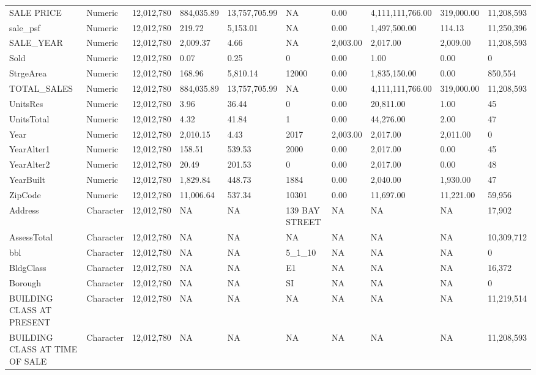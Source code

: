\documentclass[12pt,]{article}
\begin{document}
\begin{table}
{\begin{tabular}[t]{llllllllll}
SALE PRICE & Numeric & 12,012,780 & 884,035.89 & 13,757,705.99 & NA & 0.00 & 4,111,111,766.00 & 319,000.00 & 11,208,593\\
sale\_psf & Numeric & 12,012,780 & 219.72 & 5,153.01 & NA & 0.00 & 1,497,500.00 & 114.13 & 11,250,396\\
SALE\_YEAR & Numeric & 12,012,780 & 2,009.37 & 4.66 & NA & 2,003.00 & 2,017.00 & 2,009.00 & 11,208,593\\
Sold & Numeric & 12,012,780 & 0.07 & 0.25 & 0 & 0.00 & 1.00 & 0.00 & 0\\
StrgeArea & Numeric & 12,012,780 & 168.96 & 5,810.14 & 12000 & 0.00 & 1,835,150.00 & 0.00 & 850,554\\
\addlinespace
TOTAL\_SALES & Numeric & 12,012,780 & 884,035.89 & 13,757,705.99 & NA & 0.00 & 4,111,111,766.00 & 319,000.00 & 11,208,593\\
UnitsRes & Numeric & 12,012,780 & 3.96 & 36.44 & 0 & 0.00 & 20,811.00 & 1.00 & 45\\
UnitsTotal & Numeric & 12,012,780 & 4.32 & 41.84 & 1 & 0.00 & 44,276.00 & 2.00 & 47\\
Year & Numeric & 12,012,780 & 2,010.15 & 4.43 & 2017 & 2,003.00 & 2,017.00 & 2,011.00 & 0\\
YearAlter1 & Numeric & 12,012,780 & 158.51 & 539.53 & 2000 & 0.00 & 2,017.00 & 0.00 & 45\\
\addlinespace
YearAlter2 & Numeric & 12,012,780 & 20.49 & 201.53 & 0 & 0.00 & 2,017.00 & 0.00 & 48\\
YearBuilt & Numeric & 12,012,780 & 1,829.84 & 448.73 & 1884 & 0.00 & 2,040.00 & 1,930.00 & 47\\
ZipCode & Numeric & 12,012,780 & 11,006.64 & 537.34 & 10301 & 0.00 & 11,697.00 & 11,221.00 & 59,956\\
Address & Character & 12,012,780 & NA & NA & 139 BAY STREET & NA & NA & NA & 17,902\\
AssessTotal & Character & 12,012,780 & NA & NA & NA & NA & NA & NA & 10,309,712\\
\addlinespace
bbl & Character & 12,012,780 & NA & NA & 5\_1\_10 & NA & NA & NA & 0\\
BldgClass & Character & 12,012,780 & NA & NA & E1 & NA & NA & NA & 16,372\\
Borough & Character & 12,012,780 & NA & NA & SI & NA & NA & NA & 0\\
BUILDING CLASS AT PRESENT & Character & 12,012,780 & NA & NA & NA & NA & NA & NA & 11,219,514\\
BUILDING CLASS AT TIME OF SALE & Character & 12,012,780 & NA & NA & NA & NA & NA & NA & 11,208,593\\

\end{tabular}}
\end{table}
\end{document}
